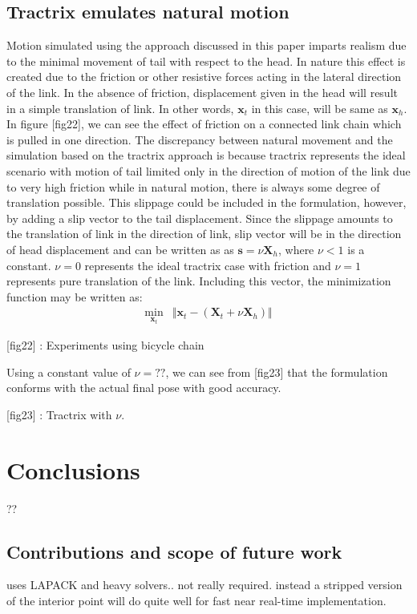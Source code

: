 \documentclass[12pt,a4]{article}
\begin{document}
\subsection{Tractrix  emulates natural motion}
Motion simulated using the approach discussed in this paper imparts realism due to the minimal movement of tail with respect to the head. In nature this effect is created due to the friction or other resistive forces acting in the lateral direction of the link. In the absence of friction, displacement given in the head will result in a simple translation of link. In other words, $\mathbf{x}_t$ in this case, will be same as $\mathbf{x}_h$. In figure [fig22], we can see the effect of friction on a connected link chain which is pulled in one direction. The discrepancy between natural movement and the simulation based on the tractrix approach is because tractrix represents the ideal scenario with motion of tail limited only in the direction of motion of the link due to very high friction while in natural motion, there is always some degree of translation possible. This slippage could be included in the formulation, however, by adding a slip vector to the tail displacement. Since the slippage amounts to the translation of link in the direction of link, slip vector will be in the direction of head displacement and can be written as as $\mathbf{s} = \nu \mathbf{X}_h$, where $\nu<1$ is a constant. $\nu=0$ represents the ideal tractrix case with friction and $\nu=1$ represents pure translation of the link. Including this vector, the minimization function may be written as:
\begin{align}
\min_{\textbf{x}_t} &\Vert \textbf{x}_t-\left(\mathbf{X}_t + \nu \mathbf{X}_h \right) \Vert
\end{align}

[fig22] : Experiments using bicycle chain

Using a constant value of $\nu = ??$, we can see from [fig23] that the formulation conforms with the actual final pose with good accuracy. 

[fig23] : Tractrix with $\nu$.


\section{Conclusions}

??


\subsection{Contributions and scope of future work}
uses LAPACK and heavy solvers.. not really required. instead a stripped version of the interior point will do quite well for fast near real-time implementation. 
\end{document}
